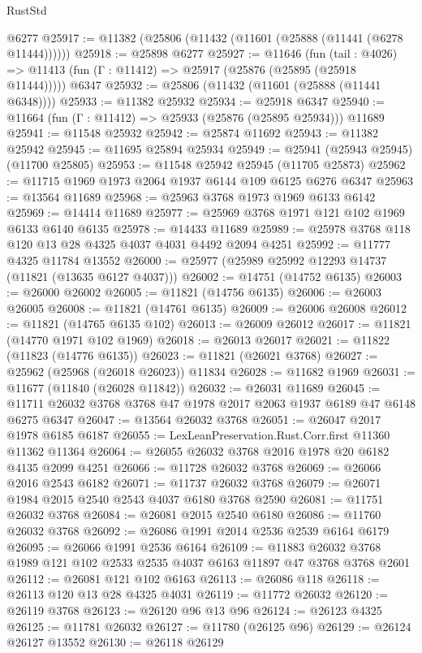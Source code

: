 \begin{lexlean}{RustStd}
\begin{coremodule}
    @6277
@25917 := @11382 (@25806 (@11432 (@11601 (@25888 (@11441 (@6278 @11444))))))
@25918 := @25898 @6277
@25927 := @11646
    (fun (tail : @4026) => @11413 (fun (Γ : @11412) => @25917 (@25876 (@25895 (@25918 @11444)))))
    @6347
@25932 := @25806 (@11432 (@11601 (@25888 (@11441 @6348))))
@25933 := @11382 @25932
@25934 := @25918 @6347
@25940 := @11664 (fun (Γ : @11412) => @25933 (@25876 (@25895 @25934))) @11689
@25941 := @11548 @25932
@25942 := @25874 @11692
@25943 := @11382 @25942
@25945 := @11695 @25894 @25934
@25949 := @25941 (@25943 @25945) (@11700 @25805)
@25953 := @11548 @25942 @25945 (@11705 @25873)
@25962 := @11715 @1969 @1973 @2064 @1937 @6144 @109 @6125 @6276 @6347
@25963 := @13564 @11689
@25968 := @25963 @3768 @1973 @1969 @6133 @6142
@25969 := @14414 @11689
@25977 := @25969 @3768 @1971 @121 @102 @1969 @6133 @6140 @6135
@25978 := @14433 @11689
@25989 := @25978 @3768 @118 @120 @13 @28 @4325 @4037 @4031 @4492 @2094 @4251
@25992 := @11777 @4325 @11784 @13552
@26000 := @25977 (@25989 @25992 @12293 @14737 (@11821 (@13635 @6127 @4037)))
@26002 := @14751 (@14752 @6135)
@26003 := @26000 @26002
@26005 := @11821 (@14756 @6135)
@26006 := @26003 @26005
@26008 := @11821 (@14761 @6135)
@26009 := @26006 @26008
@26012 := @11821 (@14765 @6135 @102)
@26013 := @26009 @26012
@26017 := @11821 (@14770 @1971 @102 @1969)
@26018 := @26013 @26017
@26021 := @11822 (@11823 (@14776 @6135))
@26023 := @11821 (@26021 @3768)
@26027 := @25962 (@25968 (@26018 @26023)) @11834
@26028 := @11682 @1969
@26031 := @11677 (@11840 (@26028 @11842))
@26032 := @26031 @11689
@26045 := @11711 @26032 @3768 @3768 @47 @1978 @2017 @2063 @1937 @6189 @47 @6148 @6275 @6347
@26047 := @13564 @26032 @3768
@26051 := @26047 @2017 @1978 @6185 @6187
@26055 := LexLeanPreservation.Rust.Corr.first @11360 @11362 @11364
@26064 := @26055 @26032 @3768 @2016 @1978 @20 @6182 @4135 @2099 @4251
@26066 := @11728 @26032 @3768
@26069 := @26066 @2016 @2543 @6182
@26071 := @11737 @26032 @3768
@26079 := @26071 @1984 @2015 @2540 @2543 @4037 @6180 @3768 @2590
@26081 := @11751 @26032 @3768
@26084 := @26081 @2015 @2540 @6180
@26086 := @11760 @26032 @3768
@26092 := @26086 @1991 @2014 @2536 @2539 @6164 @6179
@26095 := @26066 @1991 @2536 @6164
@26109 := @11883 @26032 @3768 @1989 @121 @102 @2533 @2535 @4037 @6163 @11897 @47 @3768 @3768 @2601
@26112 := @26081 @121 @102 @6163
@26113 := @26086 @118
@26118 := @26113 @120 @13 @28 @4325 @4031
@26119 := @11772 @26032
@26120 := @26119 @3768
@26123 := @26120 @96 @13 @96
@26124 := @26123 @4325
@26125 := @11781 @26032
@26127 := @11780 (@26125 @96)
@26129 := @26124 @26127 @13552
@26130 := @26118 @26129

\end{coremodule}
\end{lexlean}
